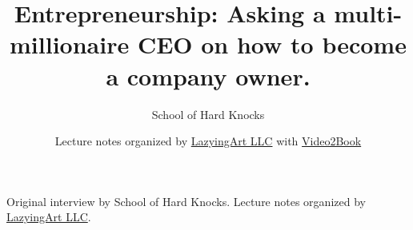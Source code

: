 \documentclass[11pt,oneside]{book}
\begin{document}
\frontmatter
\title{Entrepreneurship: Asking a multi-millionaire CEO on how to become a company owner.}
\author{School of Hard Knocks}
\date{Lecture notes organized by \href{https://lazying.art}{LazyingArt LLC} with \href{https://github.com/lachlanchen/Video2Book}{Video2Book}}
\maketitle
\begin{center}
\small Original interview by School of Hard Knocks. Lecture notes organized by \href{https://lazying.art}{LazyingArt LLC}.
\end{center}
\clearpage
\mainmatter

\end{document}
